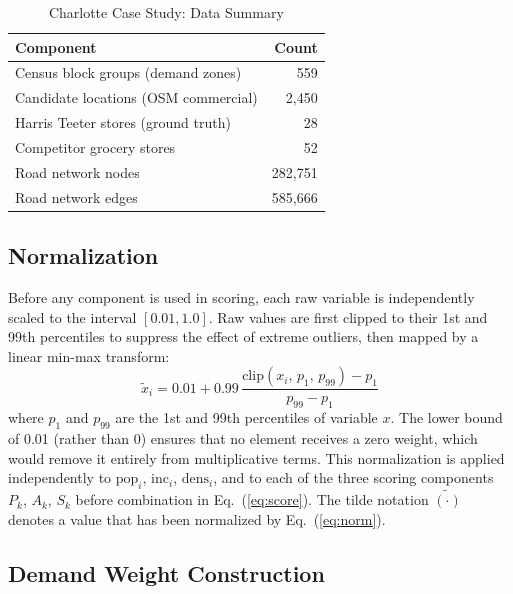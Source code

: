 \documentclass[conference]{IEEEtran}
\begin{document}
\begin{table}[!t]
\centering
\caption{Charlotte Case Study: Data Summary}
\label{tab:data_summary}
\begin{tabular}{lr}
\toprule
\textbf{Component} & \textbf{Count} \\
\midrule
Census block groups (demand zones) & 559 \\
Candidate locations (OSM commercial) & 2{,}450 \\
Harris Teeter stores (ground truth) & 28 \\
Competitor grocery stores & 52 \\
Road network nodes & 282{,}751 \\
Road network edges & 585{,}666 \\
\bottomrule
\end{tabular}
\end{table}

\subsection{Normalization}
\label{sec:norm}

Before any component is used in scoring, each raw variable is
independently scaled to the interval $[0.01, 1.0]$.  Raw values are
first clipped to their 1st and 99th percentiles to suppress the effect
of extreme outliers, then mapped by a linear min-max transform:
\begin{equation}
\tilde{x}_i
  = 0.01 + 0.99\,\frac{
      \text{clip}(x_i,\,p_1,\,p_{99}) - p_1
    }{
      p_{99} - p_1
    }
\label{eq:norm}
\end{equation}
where $p_1$ and $p_{99}$ are the 1st and 99th percentiles of variable
$x$.  The lower bound of 0.01 (rather than 0) ensures that no element
receives a zero weight, which would remove it entirely from
multiplicative terms.  This normalization is applied independently to
$\text{pop}_i$, $\text{inc}_i$, $\text{dens}_i$, and to each of the
three scoring components $P_k$, $A_k$, $S_k$ before combination in
Eq.~(\ref{eq:score}).  The tilde notation $\tilde{(\cdot)}$ denotes a
value that has been normalized by Eq.~(\ref{eq:norm}).

\subsection{Demand Weight Construction}
\end{document}
